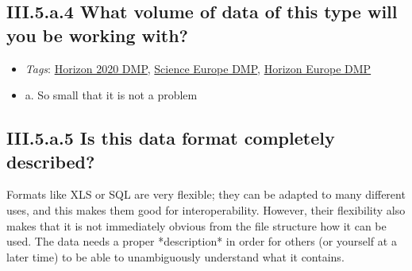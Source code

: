 \documentclass[a4paper,12pt]{report}
\begin{document}
\subsection*{\protect\textcolor{colorSecId}{III.5.a.4} What volume of data of this type will you be working with?}

\label{b1df3c74-0b1f-4574-81c4-4cc2d780c1af.b08fe063-33f8-4380-b3a9-ba1e586dedf2.60574746-e0ce-44c6-8095-a4ed4ebf8d54.ba9e42fc-2bf5-413f-85de-003f981aaf81}


\begin{itemize}
  \item \textit{Tags}: \ul{Horizon 2020 DMP}, \ul{Science Europe DMP}, \ul{Horizon Europe DMP}
  \end{itemize}




\begin{itemize}
  \item[\CheckmarkBold] a. So small that it is not a problem
\end{itemize}





\subsection*{\protect\textcolor{colorSecId}{III.5.a.5} Is this data format completely described?}

\label{b1df3c74-0b1f-4574-81c4-4cc2d780c1af.b08fe063-33f8-4380-b3a9-ba1e586dedf2.60574746-e0ce-44c6-8095-a4ed4ebf8d54.192fc5d3-dc2a-495c-8f24-f59a4c5d95c9}




\noindent
\begin{markdown}
Formats like XLS or SQL are very flexible; they can be adapted to many different uses, and this makes them good for interoperability. However, their flexibility also makes that it is not immediately obvious from the file structure how it can be used. The data needs a proper *description* in order for others (or yourself at a later time) to be able to unambiguously understand what it contains.
\end{markdown}
\end{document}
